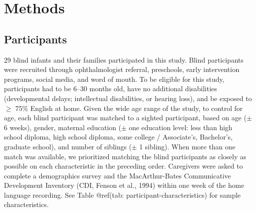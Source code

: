 \documentclass[
  man,floatsintext]{apa6}
\begin{document}
\hypertarget{methods}{%
\section{Methods}\label{methods}}

\hypertarget{participants}{%
\subsection{Participants}\label{participants}}

29 blind infants and their families participated in this study. Blind participants were recruited through ophthalmologist referral, preschools, early intervention programs, social media, and word of mouth. To be eligible for this study, participants had to be 6--30 months old, have no additional disabilities (developmental delays; intellectual disabilities, or hearing loss), and be exposed to \(\geq\) 75\% English at home. Given the wide age range of the study, to control for age, each blind participant was matched to a sighted participant, based on age (\(\pm\) 6 weeks), gender, maternal education (\(\pm\) one education level: less than high school diploma, high school diploma, some college / Associate's, Bachelor's, graduate school), and number of siblings (\(\pm\) 1 sibling). When more than one match was available, we prioritized matching the blind participants as closely as possible on each characteristic in the preceding order. Caregivers were asked to complete a demographics survey and the MacArthur-Bates Communicative Development Inventory (CDI, Fenson et al., 1994) within one week of the home language recording. See Table @ref(tab: participant-characteristics) for sample characteristics.
\end{document}
